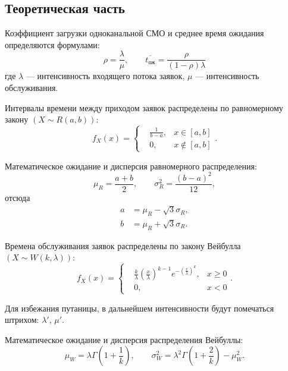 \documentclass[a4paper, 14pt]{extreport}
\begin{document}
\begin{MainPart}
\section{Теоретическая часть}

Коэффициент загрузки одноканальной СМО и среднее время ожидания определяются формулами:
\begin{equation}
	\label{eqn:load-and-wait}
	\rho = \frac\lambda\mu, \qquad \overline{t_{\text{ож}}} = \frac{\rho}{(1 - \rho)\lambda}
\end{equation}
где $\lambda$ — интенсивность входящего потока заявок, $\mu$ — интенсивность обслуживания.

Интервалы времени между приходом заявок распределены по равномерному закону $(X \sim R(a, b))$:
\begin{equation}
	f_X(x) = \left\{
	\begin{aligned}
		&\frac{1}{b - a}, & x \in [a, b] \\
		&0,               & x \not\in [a, b]
	\end{aligned}
	\right..
\end{equation}

Математическое ожидание и дисперсия равномерного распределения:
\begin{equation}
	\mu_R = \frac{a + b}{2}, \qquad \sigma_R^2 = \frac{(b - a)^2}{12},
\end{equation}
отсюда
\begin{equation}
	\begin{aligned}
		a &= \mu_R - \sqrt{3}\sigma_R, \\
		b &= \mu_R + \sqrt{3}\sigma_R.
	\end{aligned}
\end{equation}

Времена обслуживания заявок распределены по закону Вейбулла $(X \sim W(k, \lambda))$:
\begin{equation}
	f_X(x) = \left\{
	\begin{aligned}
		& \frac k\lambda \left(\frac x\lambda\right)^{k-1} e^{-\left(\frac x\lambda\right)^k}, & x \geqslant 0 \\
		& 0,                                                                                   & x < 0
	\end{aligned}
	\right..
\end{equation}

Для избежания путаницы, в дальнейшем интенсивности будут помечаться штрихом: $\lambda'$, $\mu'$.

Математическое ожидание и дисперсия распределения Вейбуллы:
\begin{equation}
	\label{eqn:weibull-mean-and-variance}
	\mu_W = \lambda\Gamma{\left(1 + \frac1k\right)}, \qquad \sigma_W^2 = \lambda^2\Gamma{\left(1 + \frac2k\right)} - \mu_W^2.
\end{equation}


\end{MainPart}
\end{document}
